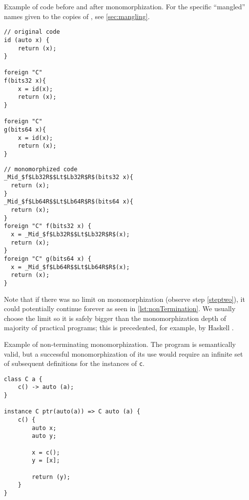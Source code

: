 \begin{codex}
    \caption{Example of code before and after monomorphization. For the specific ``mangled'' names given to the copies of , see \cref{sec:mangling}.}
    \label{lst:mono}
    \begin{center}
    \begin{minipage}{0.4\linewidth}
    \begin{lstlisting}
// original code
id (auto x) {
    return (x);
}

foreign "C"
f(bits32 x){
    x = id(x);
    return (x);
}

foreign "C"
g(bits64 x){
    x = id(x);
    return (x);
}
\end{lstlisting}
    \end{minipage}%
    \begin{minipage}{0.6\linewidth}
    \begin{lstlisting}
// monomorphized code
_Mid_$f$Lb32R$$Lt$Lb32R$R$(bits32 x){
  return (x);
}
_Mid_$f$Lb64R$$Lt$Lb64R$R$(bits64 x){
  return (x);
}
foreign "C" f(bits32 x) {
  x = _Mid_$f$Lb32R$$Lt$Lb32R$R$(x);
  return (x);
}
foreign "C" g(bits64 x) {
  x = _Mid_$f$Lb64R$$Lt$Lb64R$R$(x);
  return (x);
}
\end{lstlisting}
    \end{minipage}

    \end{center}
\end{codex}

Note that if there was no limit on monomorphization (observe step \ref{steptwo}), it could potentially continue forever as seen in \cref{lst:nonTermination}. We usually choose the limit so it is safely bigger than the monomorphization depth of majority of practical programs; this is precedented, for example, by Haskell \cite{haskell2010}.

\begin{codex}
    \caption{Example of non-terminating monomorphization. The program is semantically valid, but a successful monomorphization of its use would require an infinite set of subsequent definitions for the instances of \texttt{c}.}
    \label{lst:nonTermination}

    \begin{lstlisting}
class C a {
    c() -> auto (a);
}

instance C ptr(auto(a)) => C auto (a) {
    c() {
        auto x;
        auto y;

        x = c();
        y = [x];

        return (y);
    }
}
    \end{lstlisting}
\end{codex}

